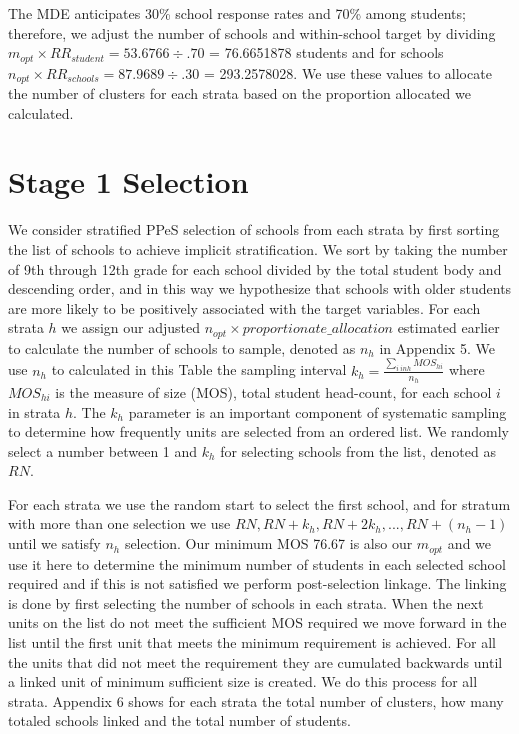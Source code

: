\documentclass[
  12pt]{article}
\begin{document}
The MDE anticipates 30\% school response rates and 70\% among students;
therefore, we adjust the number of schools and within-school target by
dividing\(m_{opt} \times RR_{student} = 53.6766 \div .70\) = 76.6651878
students and for schools
\(n_{opt} \times RR_{schools} =  87.9689 \div .30\) = 293.2578028. We
use these values to allocate the number of clusters for each strata
based on the proportion allocated we calculated.

\section{Stage 1 Selection}\label{stage-1-selection}

We consider stratified PPeS selection of schools from each strata by
first sorting the list of schools to achieve implicit stratification. We
sort by taking the number of 9th through 12th grade for each school
divided by the total student body and descending order, and in this way
we hypothesize that schools with older students are more likely to be
positively associated with the target variables. For each strata \(h\)
we assign our adjusted \(n_{opt} \times proportionate \_ allocation\)
estimated earlier to calculate the number of schools to sample, denoted
as \(n_h\) in Appendix 5. We use \(n_h\) to calculated in this Table the
sampling interval \(k_h = \frac{\sum_{i \ in h} MOS_{hi}}{n_h}\) where
\(MOS_{hi}\) is the measure of size (MOS), total student head-count, for
each school \(i\) in strata \(h\). The \(k_h\) parameter is an important
component of systematic sampling to determine how frequently units are
selected from an ordered list. We randomly select a number between 1 and
\(k_h\) for selecting schools from the list, denoted as \(RN\).

For each strata we use the random start to select the first school, and
for stratum with more than one selection we use
\(RN, RN+k_h, RN+2k_h,...,RN +(n_h-1)\) until we satisfy \(n_h\)
selection. Our minimum MOS 76.67 is also our \(m_{opt}\) and we use it
here to determine the minimum number of students in each selected school
required and if this is not satisfied we perform post-selection linkage.
The linking is done by first selecting the number of schools in each
strata. When the next units on the list do not meet the sufficient MOS
required we move forward in the list until the first unit that meets the
minimum requirement is achieved. For all the units that did not meet the
requirement they are cumulated backwards until a linked unit of minimum
sufficient size is created. We do this process for all strata. Appendix
6 shows for each strata the total number of clusters, how many totaled
schools linked and the total number of students.
\end{document}
